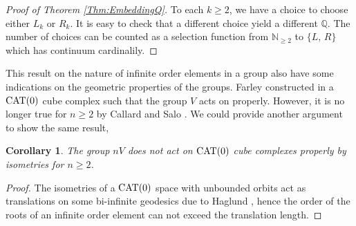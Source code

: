 \documentclass[12pt,reqno]{amsart}
\theoremstyle{plain}
\newtheorem{corollary}[theorem]{Corollary}
\theoremstyle{definition}
\theoremstyle{remark}
\numberwithin{equation}{section}
\begin{document}
\begin{proof}[Proof of Theorem \ref{Thm:EmbeddingQ}] 	
	To each  $k \geq 2$, 
	we have a choice to choose either  $L_k$  or  $R_k$.  
	It is easy to check that a different choice yield a different $\mathbb{Q}$.  
	The number of choices can be counted as a selection function 
	from  $\mathbb{N}_{\geq 2}$  to  $\{ L, \, R \}$  which has continuum cardinalily.  
\end{proof}


%
This result on the nature of infinite order elements in a group also have some indications 
on the geometric properties of the groups.  
Farley constructed in  \cite{F}  a ${\rm CAT}(0)$ cube complex
such that the group $V$ acts on properly. 
However, 
it is no longer true for  $n \geq 2$   by  Callard and Salo  \cite{CS}.  
We could provide another argument to show the same result,  

\begin{corollary}
       The group  $nV$  does not act on  ${\rm CAT}(0)$  
       cube complexes properly by isometries
       for  $n \geq 2$.  
\end{corollary}
\begin{proof} 
	The isometries of a ${\rm CAT}(0)$ space with unbounded orbits act 
	as translations on some bi-infinite geodesics due to Haglund  \cite{Haglund}, 
	hence the order of the roots of an infinite order element 
	can not exceed the translation length.
\end{proof} 



%
%


\end{document}
